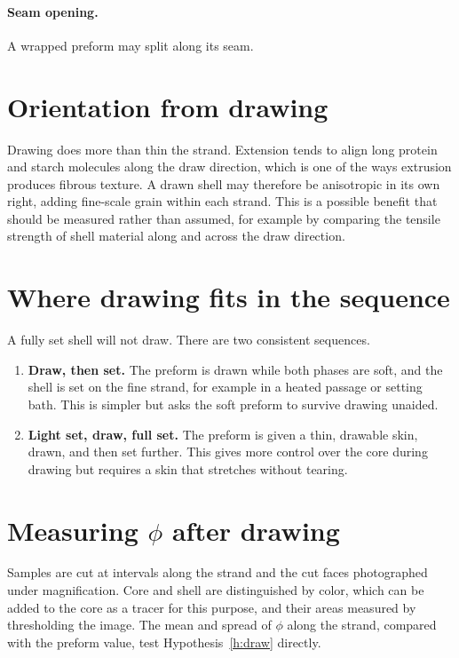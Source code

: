 \documentclass[11pt,openany]{book}
\theoremstyle{definition}
\begin{document}
\paragraph{Seam opening.} A wrapped preform may split along its seam.

\section{Orientation from drawing}

Drawing does more than thin the strand. Extension tends to align long protein and starch molecules along the draw direction, which is one of the ways extrusion produces fibrous texture. A drawn shell may therefore be anisotropic in its own right, adding fine-scale grain within each strand. This is a possible benefit that should be measured rather than assumed, for example by comparing the tensile strength of shell material along and across the draw direction.

\section{Where drawing fits in the sequence}

A fully set shell will not draw. There are two consistent sequences.

\begin{enumerate}
\item \textbf{Draw, then set.} The preform is drawn while both phases are soft, and the shell is set on the fine strand, for example in a heated passage or setting bath. This is simpler but asks the soft preform to survive drawing unaided.
\item \textbf{Light set, draw, full set.} The preform is given a thin, drawable skin, drawn, and then set further. This gives more control over the core during drawing but requires a skin that stretches without tearing.
\end{enumerate}

\section{Measuring \texorpdfstring{$\phi$}{phi} after drawing}

Samples are cut at intervals along the strand and the cut faces photographed under magnification. Core and shell are distinguished by color, which can be added to the core as a tracer for this purpose, and their areas measured by thresholding the image. The mean and spread of $\phi$ along the strand, compared with the preform value, test Hypothesis~\ref{h:draw} directly.
\end{document}
